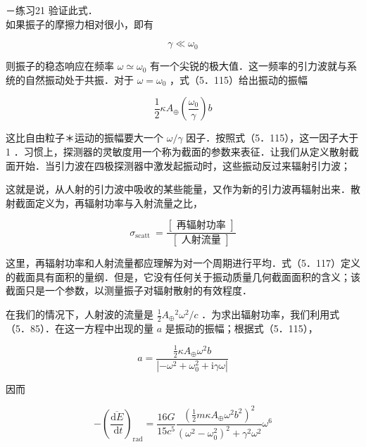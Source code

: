 －练习21 验证此式．\\
如果振子的摩擦力相对很小，即有

$$
\gamma \ll \omega_{0}
$$

则振子的稳态响应在频率 $\omega \simeq \omega_{0}$ 有一个尖锐的极大值．这一频率的引力波就与系统的自然振动处于共振．对于 $\omega=\omega_{0}$ ，式（5．115）给出振动的振幅


\begin{equation*}
	\frac{1}{2} \kappa A_{\oplus}\left(\frac{\omega_{0}}{\gamma}\right) b \tag{5.116}
\end{equation*}


这比自由粒子＊运动的振幅要大一个 $\omega / \gamma$ 因子．按照式（5．115），这一因子大于 1 ．习惯上，探测器的灵敏度用一个称为截面的参数来表征．让我们从定义散射截面开始．当引力波在四极探测器中激发起振动时，这些振动反过来辐射引力波；

这就是说，从人射的引力波中吸收的某些能量，又作为新的引力波再辐射出来．散射截面定义为，再辐射功率与入射流量之比，


\begin{equation*}
	\sigma_{\text {scatt }}=\frac{[\text { 再辐射功率 }]}{[\text { 人射流量 }]} \tag{5,117}
\end{equation*}


这里，再辐射功率和人射流量都应理解为对一个周期进行平均．式（5．117）定义的截面具有面积的量纲．但是，它没有任何关于振动质量几何截面面积的含义；该截面只是一个参数，以测量振子对辐射散射的有效程度．

在我们的情况下，人射波的流量是 $\frac{1}{2} A_{\oplus}{ }^{2} \omega^{2} / c$ ．为求出辐射功率，我们利用式（5．85）．在这一方程中出现的量 $a$ 是振动的振幅；根据式（5．115），


\begin{equation*}
	a=\frac{\frac{1}{2} \kappa A_{\oplus} \omega^{2} b}{\left|-\omega^{2}+\omega_{0}^{2}+\mathrm{i} \gamma \omega\right|} \tag{5.118}
\end{equation*}


因而


\begin{equation*}
	-\left(\frac{\overline{\mathrm{d} E}}{\mathrm{~d} t}\right)_{\mathrm{rad}}=\frac{16 G}{15 c^{5}} \frac{\left(\frac{1}{2} m \kappa A_{\oplus} \omega^{2} b^{2}\right)^{2}}{\left(\omega^{2}-\omega_{0}^{2}\right)^{2}+\gamma^{2} \omega^{2}} \omega^{6} \tag{5.119}
\end{equation*}


